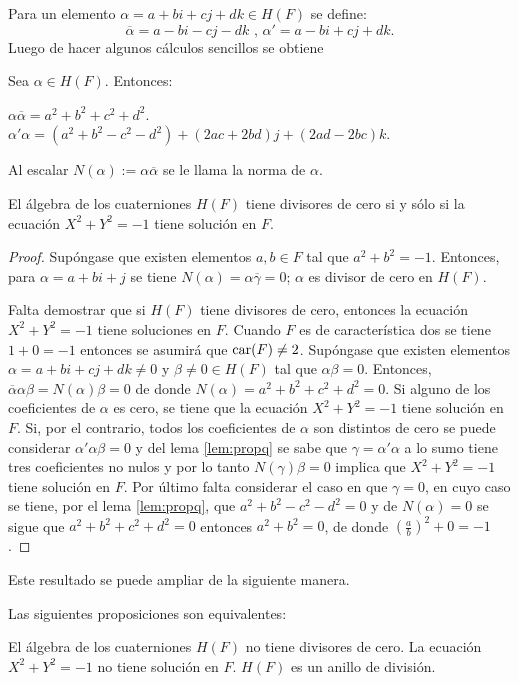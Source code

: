 Para un elemento $\alpha = a + bi + cj + dk \in H(F)$ se define:
\[
\overline{\alpha} = a - bi - cj -dk \mbox{ , } \alpha'= a - bi +cj + dk.
\]
Luego de hacer algunos cálculos sencillos se obtiene
\begin{lema}\label{lem:propq}
Sea $\alpha \in H(F)$. Entonces:
\begin{bulletList}
\newItem $\alpha\overline{\alpha} = a^2 + b^2 + c^2 + d^2$.
\newItem $\alpha'\alpha = (a^2 + b^2 - c^2 -d^2) + (2ac + 2bd)j + (2ad -2bc)k$.
\end{bulletList}
Al escalar $N(\alpha) := \alpha\overline{\alpha}$ se le llama la norma de $\alpha$.
\end{lema}
\begin{proposicion}
El álgebra de los cuaterniones $H(F)$ tiene divisores de cero si y sólo si la ecuación $X^2 + Y^2 = -1$ tiene solución en $F$.
\end{proposicion}
\begin{proof}
Supóngase que existen elementos $a,b \in F$ tal que $a^2 + b^2 = -1$. Entonces, para $\alpha = a + bi + j$ se tiene $N(\alpha) = \alpha\overline{\gamma} = 0$; $\alpha$ es divisor de cero en $H(F)$.

Falta demostrar que si $H(F)$ tiene divisores de cero, entonces la ecuación $X^2 + Y^2 = -1$ tiene soluciones en $F$. Cuando $F$ es de característica dos se tiene $1 + 0 = -1$ entonces se asumirá que $\operatorname{car} (F) \neq 2$. Supóngase que existen elementos $\alpha = a + bi + cj + dk \neq 0$ y $\beta \neq 0 \in H(F)$ tal que $\alpha\beta = 0 $. Entonces, $\overline{\alpha}\alpha\beta = N(\alpha)\beta = 0 $ de donde $N(\alpha) = a^2 +b^2 + c^2 + d^2 = 0$. Si alguno de los coeficientes de $\alpha$ es cero, se tiene que la ecuación $X^2 + Y^2 =-1$ tiene solución en $F$. Si, por el contrario, todos los coeficientes de $\alpha$ son distintos de cero se puede considerar $\alpha'\alpha\beta = 0$ y del lema \ref{lem:propq} se sabe que $\gamma = \alpha'\alpha$ a lo sumo tiene tres coeficientes no nulos y por lo tanto $N(\gamma)\beta = 0$ implica que $X^2 + Y^2 = -1$ tiene solución en $F$. Por último falta considerar el caso en que $\gamma = 0$, en cuyo caso se tiene, por el lema \ref{lem:propq}, que $a^2 + b^2 -c^2 -d^2 = 0 $ y de $N(\alpha) = 0 $ se sigue  que $a^2 + b^2 + c^2 + d^2 = 0 $ entonces $a^2 + b^2 = 0$, de donde $\left( \frac{a}{b} \right)^2 + 0 = -1$.
\end{proof}
Este resultado se puede ampliar de la siguiente manera.
\begin{proposicion}
Las siguientes proposiciones son equivalentes:
\begin{bulletList}
\newItem El álgebra de los cuaterniones $H(F)$ no tiene divisores de cero.
\newItem La ecuación $X^2 + Y^2 = -1$ no tiene solución en $F$.
\newItem $H(F)$ es un anillo de división.
\end{bulletList}
\end{proposicion}

